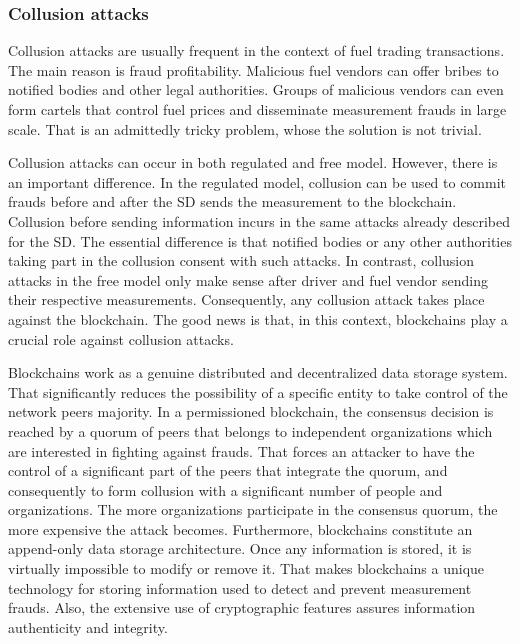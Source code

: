 \documentclass[sigplan]{acmart}
\begin{document}
\subsubsection{Collusion attacks}
Collusion attacks are usually frequent in the context of fuel trading transactions.
The main reason is fraud profitability.
Malicious fuel vendors can offer bribes to notified bodies and other legal authorities.
Groups of malicious vendors can even form cartels that control fuel prices and disseminate measurement frauds in large scale.
That is an admittedly tricky problem, whose the solution is not trivial.

Collusion attacks can occur in both regulated and free model.
However, there is an important difference.
In the regulated model, collusion can be used to commit frauds before and after the SD sends the measurement to the blockchain.
Collusion before sending information incurs in the same attacks already described for the SD.
The essential difference is that notified bodies or any other authorities taking part in the collusion consent with such attacks.
In contrast, collusion attacks in the free model only make sense after driver and fuel vendor sending their respective measurements.
Consequently, any collusion attack takes place against the blockchain.
The good news is that, in this context, blockchains play a crucial role against collusion attacks.

Blockchains work as a genuine distributed and decentralized data storage system.
That significantly reduces the possibility of a specific entity to take control of the network peers majority. %
In a permissioned blockchain, the consensus decision is reached by a quorum of peers that belongs to independent organizations which are interested in fighting against frauds.
That forces an attacker to have the control of a significant part of the peers that integrate the quorum, and consequently to form collusion with a significant number of people and organizations.
The more organizations participate in the consensus quorum, the more expensive the attack becomes.
Furthermore, blockchains constitute an append-only data storage architecture.
Once any information is stored, it is virtually impossible to modify or remove it.
That makes blockchains a unique technology for storing information used to detect and prevent measurement frauds.
Also, the extensive use of cryptographic features assures information authenticity and integrity.
\end{document}

